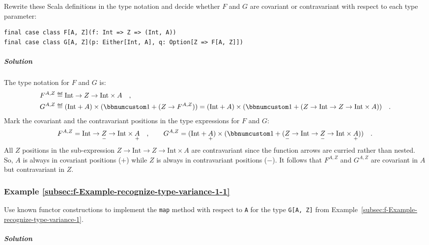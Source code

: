Rewrite these Scala definitions in the type notation and decide whether
$F$ and $G$ are covariant or contravariant with respect to each
type parameter:

\begin{lstlisting}
final case class F[A, Z](f: Int => Z => (Int, A))
final case class G[A, Z](p: Either[Int, A], q: Option[Z => F[A, Z]])
\end{lstlisting}


\subparagraph{Solution}

The type notation for $F$ and $G$ is: 
\begin{align*}
 & F^{A,Z}\triangleq\text{Int}\rightarrow Z\rightarrow\text{Int}\times A\quad,\\
 & G^{A,Z}\triangleq(\text{Int}+A)\times(\bbnum 1+(Z\rightarrow F^{A,Z}))=(\text{Int}+A)\times(\bbnum 1+(Z\rightarrow\text{Int}\rightarrow Z\rightarrow\text{Int}\times A))\quad.
\end{align*}
Mark the covariant and the contravariant positions in the type expressions
for $F$ and $G$:
\[
F^{A,Z}=\text{Int}\rightarrow\underset{-}{Z}\rightarrow\text{Int}\times\underset{+}{A}\quad,\quad\quad G^{A,Z}=(\text{Int}+\underset{+}{A})\times(\bbnum 1+(\underset{-}{Z}\rightarrow\text{Int}\rightarrow\underset{-}{Z}\rightarrow\text{Int}\times\underset{+}{A}))\quad.
\]
All $Z$ positions in the sub-expression $Z\rightarrow\text{Int}\rightarrow Z\rightarrow\text{Int}\times A$
are contravariant since the function arrows are curried rather than
nested. So, $A$ is always in covariant positions ($+$) while $Z$
is always in contravariant positions ($-$). It follows that $F^{A,Z}$
and $G^{A,Z}$ are covariant in $A$ but contravariant in $Z$. 

\subsubsection{Example \label{subsec:f-Example-recognize-type-variance-1-1}\ref{subsec:f-Example-recognize-type-variance-1-1}}

Use known functor constructions to implement the \lstinline!map!
method with respect to \lstinline!A! for the type \lstinline!G[A, Z]!
from Example~\ref{subsec:f-Example-recognize-type-variance-1}.

\subparagraph{Solution}


